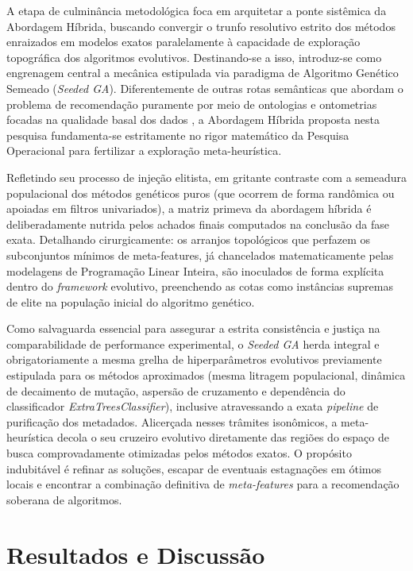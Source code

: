 \documentclass[12pt]{article}
\begin{document}
A etapa de culminância metodológica foca em arquitetar a ponte sistêmica da Abordagem Híbrida, buscando convergir o trunfo resolutivo estrito dos métodos enraizados em modelos exatos paralelamente à capacidade de exploração topográfica dos algoritmos evolutivos. Destinando-se a isso, introduz-se como engrenagem central a mecânica estipulada via paradigma de Algoritmo Genético Semeado (\textit{Seeded GA}). Diferentemente de outras rotas semânticas que abordam o problema de recomendação puramente por meio de ontologias e ontometrias focadas na qualidade basal dos dados \cite{nayak2022ontological}, a Abordagem Híbrida proposta nesta pesquisa fundamenta-se estritamente no rigor matemático da Pesquisa Operacional para fertilizar a exploração meta-heurística.

Refletindo seu processo de injeção elitista, em gritante contraste com a semeadura populacional dos métodos genéticos puros (que ocorrem de forma randômica ou apoiadas em filtros univariados), a matriz primeva da abordagem híbrida é deliberadamente nutrida pelos achados finais computados na conclusão da fase exata. Detalhando cirurgicamente: os arranjos topológicos que perfazem os subconjuntos mínimos de meta-features, já chancelados matematicamente pelas modelagens de Programação Linear Inteira, são inoculados de forma explícita dentro do \textit{framework} evolutivo, preenchendo as cotas como instâncias supremas de elite na população inicial do algoritmo genético.

Como salvaguarda essencial para assegurar a estrita consistência e justiça na comparabilidade de performance experimental, o \textit{Seeded GA} herda integral e obrigatoriamente a mesma grelha de hiperparâmetros evolutivos previamente estipulada para os métodos aproximados (mesma litragem populacional, dinâmica de decaimento de mutação, aspersão de cruzamento e dependência do classificador \textit{ExtraTreesClassifier}), inclusive atravessando a exata \textit{pipeline} de purificação dos metadados. Alicerçada nesses trâmites isonômicos, a meta-heurística decola o seu cruzeiro evolutivo diretamente das regiões do espaço de busca comprovadamente otimizadas pelos métodos exatos. O propósito indubitável é refinar as soluções, escapar de eventuais estagnações em ótimos locais e encontrar a combinação definitiva de \textit{meta-features} para a recomendação soberana de algoritmos.

\section{Resultados e Discussão}
\end{document}
